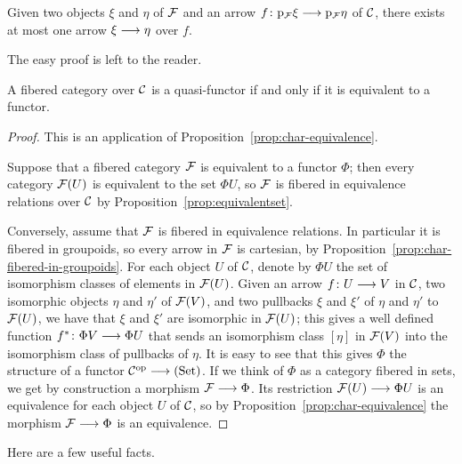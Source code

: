 \begin{3   FIBERED CATEGORIES}
\begin{3.5 Equivalences of fibered categories}
\begin{proposition}
\begin{enumeratei}
\item  Given two objects $\xi$ and $\eta$ of $\mathcal{F}$ and an arrow $f \colon \p_{\cF} \xi \arr \p_{\cF} \eta$ of $\mathcal{C}$, there exists at most one arrow $\xi \arr \eta$ over $f$.
\end{enumeratei}
\end{proposition}

The easy proof is left to the reader.

\begin{proposition}\label{prop:equivalent-functor}
A fibered category over $\mathcal{C}$ is a quasi-functor if and only if it is equivalent to a functor.
\end{proposition}

\begin{proof} This is an application of Proposition~\ref{prop:char-equivalence}.

Suppose that a fibered category $\mathcal{F}$ is equivalent to a functor $\Phi$; then every category $\mathcal{F}(U)$ is equivalent to the set $\Phi U$, so $\mathcal{F}$ is fibered in equivalence relations over $\mathcal{C}$ by Proposition~\ref{prop:equivalentset}.

Conversely, assume that $\mathcal{F}$ is fibered in equivalence relations. In particular it is fibered in groupoids, so every arrow in $\mathcal{F}$ is cartesian, by Proposition~\ref{prop:char-fibered-in-groupoids}. For each object $U$ of $\mathcal{C}$, denote by $\Phi U$ the set of isomorphism classes of elements in $\mathcal{F}(U)$. Given an arrow $f \colon U \arr V$ in $\mathcal{C}$, two isomorphic objects $\eta$ and $\eta'$ of $\mathcal{F}(V)$, and two pullbacks $\xi$ and $\xi'$ of $\eta$ and $\eta'$ to $\mathcal{F}(U)$, we have that $\xi$ and $\xi'$ are isomorphic in $\mathcal{F}(U)$; this gives a well defined function $f^* \colon \Phi V \arr \Phi U$ that sends an isomorphism class $[\eta]$ in $\mathcal{F}(V)$ into the isomorphism class of pullbacks of $\eta$. It is easy to see that this gives $\Phi$  the structure of a functor $\cC\op \arr \catset$. If we think of $\Phi$ as a category fibered in sets, we get by construction a morphism $\cF \arr \Phi$. Its restriction $\cF(U) \arr \Phi U$ is an equivalence for each object $U$ of $\mathcal{C}$, so by Proposition~\ref{prop:char-equivalence} the morphism $\cF \arr \Phi$ is an equivalence.
\end{proof}



Here are a few useful facts.


\end{3.5 Equivalences of fibered categories}
\end{3   FIBERED CATEGORIES}
